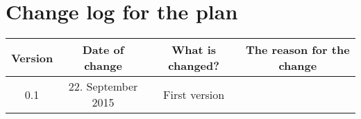 \section{Change log for the plan}
\begin{tabular}{|c|c|c|c|} 
    \hline
    Version & Date of change & What is changed? & The reason for the change \\
    \hline\hline
    0.1 & 22. September 2015 & First version & \\
   \hline
\end{tabular}